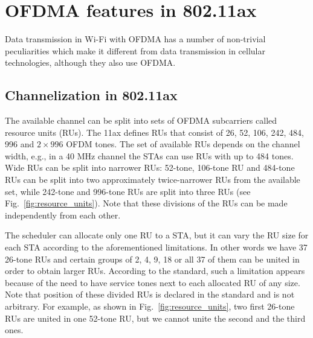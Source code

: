 \section{OFDMA features in 802.11ax}
\label{sec:features}

Data transmission in Wi-Fi with OFDMA has a number of non-trivial peculiarities which make it different from data transmission in cellular technologies, although they also use OFDMA.

\subsection{Channelization in 802.11ax}
The available channel can be split into sets of OFDMA subcarriers called resource units (RUs).
The 11ax defines RUs that consist of 26, 52, 106, 242, 484, 996 and $2\times996$ OFDM tones.
The set of available RUs depends on the channel width, e.g., in a 40 MHz channel the STAs can use RUs with up to 484 tones.
Wide RUs can be split into narrower RUs: 52-tone, 106-tone RU and 484-tone RUs can be split into two approximately twice-narrower RUs from the available set, while 242-tone and 996-tone RUs are split into three RUs (see Fig.~\ref{fig:resource_units}).
Note that these divisions of the RUs can be made independently from each other. 

The scheduler can allocate only one RU to a STA, but it can vary the RU size for each STA according to the aforementioned limitations.
In other words we have 37 26-tone RUs and certain groups of 2, 4, 9, 18 or all 37 of them can be united in order to obtain larger RUs.
According to the standard, such a limitation appears because of the need to have service tones next to each allocated RU of any size. 
Note that position of these divided RUs is declared in the standard and is not arbitrary.
For example, as shown in Fig.~\ref{fig:resource_units}, two first 26-tone RUs are united in one 52-tone RU, but we cannot unite the second and the third ones.


